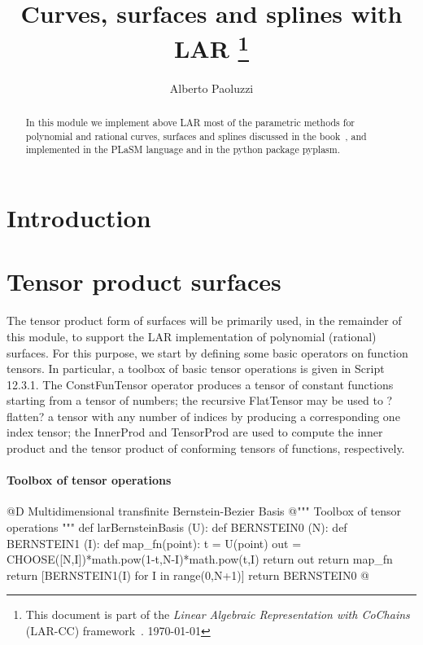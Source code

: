 \documentclass[11pt,oneside]{article}	%
\title{Curves, surfaces and splines with LAR
\footnote{This document is part of the \emph{Linear Algebraic Representation with CoChains} (LAR-CC) framework~\cite{cclar-proj:2013:00}. \today}
}
\author{Alberto Paoluzzi}
\begin{document}
\maketitle
\nonstopmode

\begin{abstract}
In this module we implement above LAR most of the parametric methods for polynomial and rational curves, surfaces and splines discussed in the book~\cite{Paoluzzi2003a}, and implemented in the PLaSM language and in the python package pyplasm. 
\end{abstract}

\tableofcontents

\section{Introduction}



\section{Tensor product surfaces}

The tensor product form of surfaces will be primarily used, in the remainder of this module, to support the LAR implementation of polynomial (rational) surfaces. For this purpose, we start by defining some basic operators on function tensors.
In particular, a toolbox of basic tensor operations is given in Script 12.3.1. The ConstFunTensor operator produces a tensor of constant functions starting from a tensor of numbers; the recursive FlatTensor may be used to ?flatten? a tensor with any number of indices by producing a corresponding one index tensor; the InnerProd and TensorProd are used to compute the inner product and the tensor product of conforming tensors of functions, respectively.


\paragraph{Toolbox of tensor operations}

@D Multidimensional transfinite Bernstein-Bezier Basis
@{""" Toolbox of tensor operations """
def larBernsteinBasis (U):
	def BERNSTEIN0 (N):
		def BERNSTEIN1 (I):
			def map_fn(point):
				t = U(point)
				out = CHOOSE([N,I])*math.pow(1-t,N-I)*math.pow(t,I)
				return out
			return map_fn
		return [BERNSTEIN1(I) for I in range(0,N+1)]
	return BERNSTEIN0
@}
\end{document}
